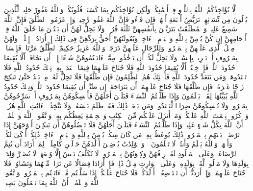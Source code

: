 \stopbuffer%
\startbuffer[\q:2:225]
لَّا یُؤَاخِذُكُمُ ٱللَّهُ بِٱللَّغۡوِ فِیۤ أَیۡمَٰنِكُمۡ وَلَٰكِن یُؤَاخِذُكُم بِمَا كَسَبَتۡ قُلُوبُكُمۡۗ وَٱللَّهُ غَفُورٌ حَلِیمࣱ%
\stopbuffer%
\startbuffer[\q:2:226]
لِّلَّذِینَ یُؤۡلُونَ مِن نِّسَاۤئِهِمۡ تَرَبُّصُ أَرۡبَعَةِ أَشۡهُرࣲۖ فَإِن فَاۤءُو فَإِنَّ ٱللَّهَ غَفُورࣱ رَّحِیمࣱ%
\stopbuffer%
\startbuffer[\q:2:227]
وَإِنۡ عَزَمُوا۟ ٱلطَّلَٰقَ فَإِنَّ ٱللَّهَ سَمِیعٌ عَلِیمࣱ%
\stopbuffer%
\startbuffer[\q:2:228]
وَٱلۡمُطَلَّقَٰتُ یَتَرَبَّصۡنَ بِأَنفُسِهِنَّ ثَلَٰثَةَ قُرُوۤءࣲۚ وَلَا یَحِلُّ لَهُنَّ أَن یَكۡتُمۡنَ مَا خَلَقَ ٱللَّهُ فِیۤ أَرۡحَامِهِنَّ إِن كُنَّ یُؤۡمِنَّ بِٱللَّهِ وَٱلۡیَوۡمِ ٱلۡءَاخِرِۚ وَبُعُولَتُهُنَّ أَحَقُّ بِرَدِّهِنَّ فِی ذَٰلِكَ إِنۡ أَرَادُوۤا۟ إِصۡلَٰحࣰاۚ وَلَهُنَّ مِثۡلُ ٱلَّذِی عَلَیۡهِنَّ بِٱلۡمَعۡرُوفِۚ وَلِلرِّجَالِ عَلَیۡهِنَّ دَرَجَةࣱۗ وَٱللَّهُ عَزِیزٌ حَكِیمٌ%
\stopbuffer%
\startbuffer[\q:2:229]
ٱلطَّلَٰقُ مَرَّتَانِۖ فَإِمۡسَاكُۢ بِمَعۡرُوفٍ أَوۡ تَسۡرِیحُۢ بِإِحۡسَٰنࣲۗ وَلَا یَحِلُّ لَكُمۡ أَن تَأۡخُذُوا۟ مِمَّاۤ ءَاتَیۡتُمُوهُنَّ شَیۡءًا إِلَّاۤ أَن یَخَافَاۤ أَلَّا یُقِیمَا حُدُودَ ٱللَّهِۖ فَإِنۡ خِفۡتُمۡ أَلَّا یُقِیمَا حُدُودَ ٱللَّهِ فَلَا جُنَاحَ عَلَیۡهِمَا فِیمَا ٱفۡتَدَتۡ بِهِۦۗ تِلۡكَ حُدُودُ ٱللَّهِ فَلَا تَعۡتَدُوهَاۚ وَمَن یَتَعَدَّ حُدُودَ ٱللَّهِ فَأُو۟لَٰۤئِكَ هُمُ ٱلظَّٰلِمُونَ%
\stopbuffer%
\startbuffer[\q:2:230]
فَإِن طَلَّقَهَا فَلَا تَحِلُّ لَهُۥ مِنۢ بَعۡدُ حَتَّىٰ تَنكِحَ زَوۡجًا غَیۡرَهُۥۗ فَإِن طَلَّقَهَا فَلَا جُنَاحَ عَلَیۡهِمَاۤ أَن یَتَرَاجَعَاۤ إِن ظَنَّاۤ أَن یُقِیمَا حُدُودَ ٱللَّهِۗ وَتِلۡكَ حُدُودُ ٱللَّهِ یُبَیِّنُهَا لِقَوۡمࣲ یَعۡلَمُونَ%
\stopbuffer%
\startbuffer[\q:2:231]
وَإِذَا طَلَّقۡتُمُ ٱلنِّسَاۤءَ فَبَلَغۡنَ أَجَلَهُنَّ فَأَمۡسِكُوهُنَّ بِمَعۡرُوفٍ أَوۡ سَرِّحُوهُنَّ بِمَعۡرُوفࣲۚ وَلَا تُمۡسِكُوهُنَّ ضِرَارࣰا لِّتَعۡتَدُوا۟ۚ وَمَن یَفۡعَلۡ ذَٰلِكَ فَقَدۡ ظَلَمَ نَفۡسَهُۥۚ وَلَا تَتَّخِذُوۤا۟ ءَایَٰتِ ٱللَّهِ هُزُوࣰاۚ وَٱذۡكُرُوا۟ نِعۡمَتَ ٱللَّهِ عَلَیۡكُمۡ وَمَاۤ أَنزَلَ عَلَیۡكُم مِّنَ ٱلۡكِتَٰبِ وَٱلۡحِكۡمَةِ یَعِظُكُم بِهِۦۚ وَٱتَّقُوا۟ ٱللَّهَ وَٱعۡلَمُوۤا۟ أَنَّ ٱللَّهَ بِكُلِّ شَیۡءٍ عَلِیمࣱ%
\stopbuffer%
\startbuffer[\q:2:232]
وَإِذَا طَلَّقۡتُمُ ٱلنِّسَاۤءَ فَبَلَغۡنَ أَجَلَهُنَّ فَلَا تَعۡضُلُوهُنَّ أَن یَنكِحۡنَ أَزۡوَٰجَهُنَّ إِذَا تَرَٰضَوۡا۟ بَیۡنَهُم بِٱلۡمَعۡرُوفِۗ ذَٰلِكَ یُوعَظُ بِهِۦ مَن كَانَ مِنكُمۡ یُؤۡمِنُ بِٱللَّهِ وَٱلۡیَوۡمِ ٱلۡءَاخِرِۗ ذَٰلِكُمۡ أَزۡكَىٰ لَكُمۡ وَأَطۡهَرُۚ وَٱللَّهُ یَعۡلَمُ وَأَنتُمۡ لَا تَعۡلَمُونَ%
\stopbuffer%
\startbuffer[\q:2:233]
۞ وَٱلۡوَٰلِدَٰتُ یُرۡضِعۡنَ أَوۡلَٰدَهُنَّ حَوۡلَیۡنِ كَامِلَیۡنِۖ لِمَنۡ أَرَادَ أَن یُتِمَّ ٱلرَّضَاعَةَۚ وَعَلَى ٱلۡمَوۡلُودِ لَهُۥ رِزۡقُهُنَّ وَكِسۡوَتُهُنَّ بِٱلۡمَعۡرُوفِۚ لَا تُكَلَّفُ نَفۡسٌ إِلَّا وُسۡعَهَاۚ لَا تُضَاۤرَّ وَٰلِدَةُۢ بِوَلَدِهَا وَلَا مَوۡلُودࣱ لَّهُۥ بِوَلَدِهِۦۚ وَعَلَى ٱلۡوَارِثِ مِثۡلُ ذَٰلِكَۗ فَإِنۡ أَرَادَا فِصَالًا عَن تَرَاضࣲ مِّنۡهُمَا وَتَشَاوُرࣲ فَلَا جُنَاحَ عَلَیۡهِمَاۗ وَإِنۡ أَرَدتُّمۡ أَن تَسۡتَرۡضِعُوۤا۟ أَوۡلَٰدَكُمۡ فَلَا جُنَاحَ عَلَیۡكُمۡ إِذَا سَلَّمۡتُم مَّاۤ ءَاتَیۡتُم بِٱلۡمَعۡرُوفِۗ وَٱتَّقُوا۟ ٱللَّهَ وَٱعۡلَمُوۤا۟ أَنَّ ٱللَّهَ بِمَا تَعۡمَلُونَ بَصِیرࣱ%
